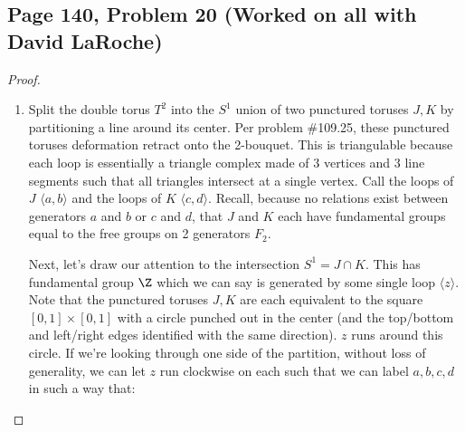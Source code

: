 \usetikzlibrary{decorations.markings,arrows.meta,bending, patterns}

\subsection*{Page 140, Problem 20 (Worked on all with David LaRoche)}
\vspace{15pt}
\begin{proof}
    \vspace{-10pt}
    \begin{enumerate}[label = (\alph*)]
        \item Split the double torus $T^2$ into the $S^1$ union of two punctured toruses $J, K$ by partitioning a line around its center. Per problem \#109.25, these punctured toruses deformation retract onto the 2-bouquet. This is triangulable because each loop is essentially a triangle complex made of 3 vertices and 3 line segments such that all triangles intersect at a single vertex. Call the loops of $J$ $\langle a,b \rangle$ and the loops of $K$ $\langle c,d \rangle.$ Recall, because no relations exist between generators $a$ and $b$ or $c$ and $d$, that $J$ and $K$ each have fundamental groups equal to the free groups on 2 generators $F_2$.
    
        Next, let's draw our attention to the intersection $S^1 = J \cap K$. This has fundamental group $\Z$ which we can say is generated by some single loop $\langle z \rangle$. Note that the punctured toruses $J, K$ are each equivalent to the square $[0,1]\times[0,1]$ with a circle punched out in the center (and the top/bottom and left/right edges identified with the same direction). $z$ runs around this circle. If we're looking through one side of the partition, without loss of generality, we can let $z$ run clockwise on each such that we can label $a,b,c,d$ in such a way that:
        \begin{center}
\end{center}
\end{enumerate}
\end{proof}
